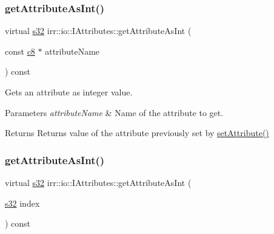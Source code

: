 \subsubsection{\texorpdfstring{get\+Attribute\+As\+Int()}{getAttributeAsInt()}\hspace{0.1cm}{\footnotesize\ttfamily [2/4]}}
{\footnotesize\ttfamily virtual \hyperlink{namespaceirr_ac66849b7a6ed16e30ebede579f9b47c6}{s32} irr\+::io\+::\+I\+Attributes\+::get\+Attribute\+As\+Int (\begin{DoxyParamCaption}\item[{const \hyperlink{namespaceirr_a9395eaea339bcb546b319e9c96bf7410}{c8} $\ast$}]{attribute\+Name }\end{DoxyParamCaption}) const\hspace{0.3cm}{\ttfamily [pure virtual]}}



Gets an attribute as integer value. 


\begin{DoxyParams}{Parameters}
{\em attribute\+Name} & Name of the attribute to get. \\
\hline
\end{DoxyParams}
\begin{DoxyReturn}{Returns}
Returns value of the attribute previously set by \hyperlink{classirr_1_1io_1_1IAttributes_a03fa31acb481ae23678676cc183f09a6}{set\+Attribute()} 
\end{DoxyReturn}
\mbox{\label{classirr_1_1io_1_1IAttributes_a71aab77245c8cfc02b547d1031548006}} 
\subsubsection{\texorpdfstring{get\+Attribute\+As\+Int()}{getAttributeAsInt()}\hspace{0.1cm}{\footnotesize\ttfamily [3/4]}}
{\footnotesize\ttfamily virtual \hyperlink{namespaceirr_ac66849b7a6ed16e30ebede579f9b47c6}{s32} irr\+::io\+::\+I\+Attributes\+::get\+Attribute\+As\+Int (\begin{DoxyParamCaption}\item[{\hyperlink{namespaceirr_ac66849b7a6ed16e30ebede579f9b47c6}{s32}}]{index }\end{DoxyParamCaption}) const\hspace{0.3cm}{\ttfamily [pure virtual]}}



